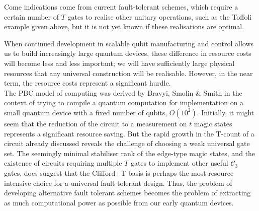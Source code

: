 \documentclass{standalone}
\begin{document}
Come indications come from current fault-tolerant schemes, which require a certain number of $T$ gates to realise other unitary operations, such as the Toffoli example given above, but it is not yet known if these realisations are optimal. 
\par
When continued development in scalable qubit manufacturing and control allows us to build increasingly large quantum devices, these difference in resource costs will become less and less important; we will have sufficiently large physical resources that any universal construction will be realisable. However, in the near term, the resource costs represent a significant hurdle. \\
The PBC model of computing was derived by Bravyi, Smolin \& Smith in the context of trying to compile a quantum computation for implementation on a small quantum device with a fixed number of qubits, $O(10^{2})$. Initially, it might seem that the reduction of the circuit to a measurement on $t$ magic states represents a significant resource saving. But the rapid growth in the T-count of a circuit already discussed reveals the challenge of choosing a weak universal gate set. The seemingly minimal stabiliser rank of the edge-type magic states, and the existence of circuits requiring multiple $T$ gates to implement other useful $\mathcal{C}_{3}$ gates, does suggest that the Clifford+T basis is perhaps the most resource intensive choice for a universal fault tolerant design. Thus, the problem of developing alternative fault tolerant schemes becomes the problem of extracting as much computational power as possible from our early quantum devices. 
\ifstandalone

\fi
\end{document}
